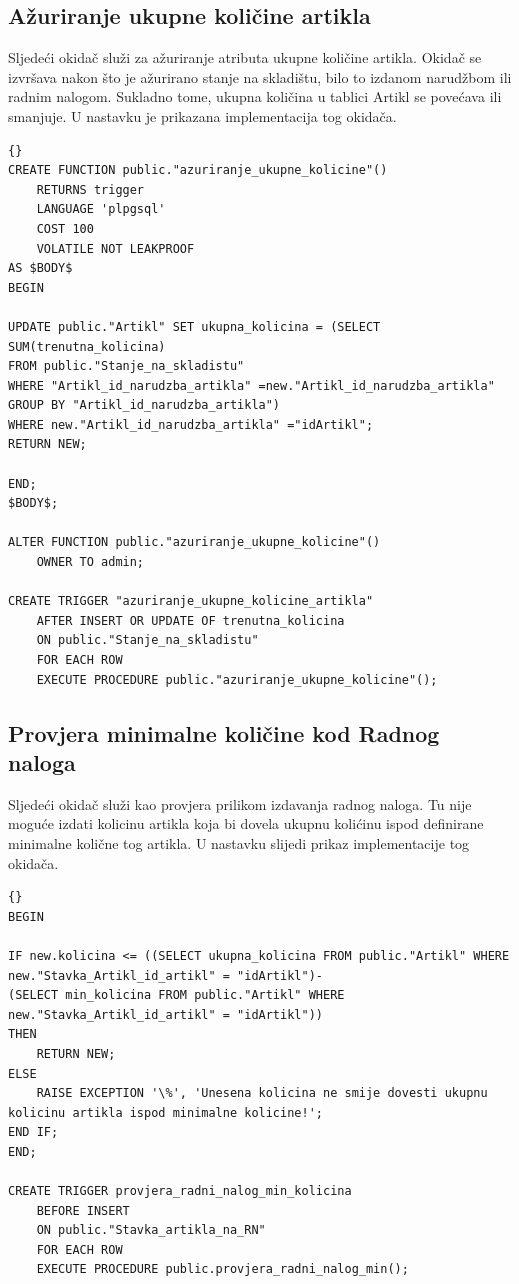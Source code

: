 \documentclass{foi}
\begin{document}
\subsection{Ažuriranje ukupne količine artikla}
Sljedeći okidač služi za ažuriranje atributa ukupne količine artikla. Okidač se izvršava nakon što je ažurirano stanje na skladištu, bilo to izdanom narudžbom ili radnim nalogom. Sukladno tome, ukupna količina u tablici Artikl se povećava ili smanjuje. U nastavku je prikazana implementacija tog okidača.
\lstset{commentstyle=\textit,language=python}
\begin{lstlisting}[frame=tb]{}
CREATE FUNCTION public."azuriranje_ukupne_kolicine"()
    RETURNS trigger
    LANGUAGE 'plpgsql'
    COST 100
    VOLATILE NOT LEAKPROOF
AS $BODY$
BEGIN

UPDATE public."Artikl" SET ukupna_kolicina = (SELECT SUM(trenutna_kolicina) 
FROM public."Stanje_na_skladistu" 
WHERE "Artikl_id_narudzba_artikla" =new."Artikl_id_narudzba_artikla" 
GROUP BY "Artikl_id_narudzba_artikla")
WHERE new."Artikl_id_narudzba_artikla" ="idArtikl";
RETURN NEW;

END;
$BODY$;

ALTER FUNCTION public."azuriranje_ukupne_kolicine"()
    OWNER TO admin;
    
CREATE TRIGGER "azuriranje_ukupne_kolicine_artikla"
    AFTER INSERT OR UPDATE OF trenutna_kolicina
    ON public."Stanje_na_skladistu"
    FOR EACH ROW
    EXECUTE PROCEDURE public."azuriranje_ukupne_kolicine"();
\end{lstlisting}
\newpage
\subsection{Provjera minimalne količine kod Radnog naloga}
Sljedeći okidač služi kao provjera prilikom izdavanja radnog naloga. Tu nije moguće izdati kolicinu artikla koja bi dovela ukupnu kolićinu ispod definirane minimalne količne tog artikla. U nastavku slijedi prikaz implementacije tog okidača.

\lstset{commentstyle=\textit,language=python}
\begin{lstlisting}[frame=tb]{}
BEGIN

IF new.kolicina <= ((SELECT ukupna_kolicina FROM public."Artikl" WHERE new."Stavka_Artikl_id_artikl" = "idArtikl")-
(SELECT min_kolicina FROM public."Artikl" WHERE  new."Stavka_Artikl_id_artikl" = "idArtikl"))
THEN
	RETURN NEW;
ELSE
	RAISE EXCEPTION '\%', 'Unesena kolicina ne smije dovesti ukupnu kolicinu artikla ispod minimalne kolicine!';
END IF;
END;

CREATE TRIGGER provjera_radni_nalog_min_kolicina
    BEFORE INSERT
    ON public."Stavka_artikla_na_RN"
    FOR EACH ROW
    EXECUTE PROCEDURE public.provjera_radni_nalog_min();
\end{lstlisting}
\newpage
\end{document}

